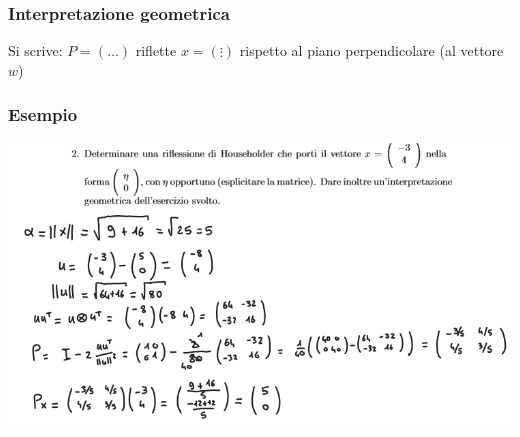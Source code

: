 \documentclass[10pt]{article}
\begin{document}
\subsubsection{Interpretazione geometrica}
Si scrive: $P=(\ldots)$ riflette $x=\left(\vdots\right)$ rispetto al piano perpendicolare (al vettore $w$)
\subsubsection*{Esempio}
\begin{center}
    \includegraphics[scale=0.5]{householder.png}
\end{center}
\end{document}
